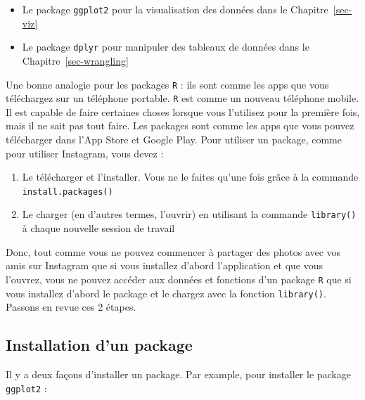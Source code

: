 \documentclass[
  a4paper,
  DIV=11,
  numbers=noendperiod,
  oneside]{scrreprt}
\providecommand{\tightlist}{%
  \setlength{\itemsep}{0pt}\setlength{\parskip}{0pt}}\usepackage{longtable,booktabs,array}
\begin{document}
\begin{itemize}
\tightlist
\item
  Le package \texttt{ggplot2} pour la visualisation des données dans le
  Chapitre~\ref{sec-viz}
\item
  Le package \texttt{dplyr} pour manipuler des tableaux de données dans
  le Chapitre~\ref{sec-wrangling}
\end{itemize}

Une bonne analogie pour les packages \texttt{R} : ils sont comme les
apps que vous téléchargez sur un téléphone portable. \texttt{R} est
comme un nouveau téléphone mobile. Il est capable de faire certaines
choses lorsque vous l'utilisez pour la première fois, mais il ne sait
pas tout faire. Les packages sont comme les apps que vous pouvez
télécharger dans l'App Store et Google Play. Pour utiliser un package,
comme pour utiliser Instagram, vous devez :

\begin{enumerate}
\def\labelenumi{\arabic{enumi}.}
\tightlist
\item
  Le télécharger et l'installer. Vous ne le faites qu'une fois grâce à
  la commande \texttt{install.packages()}
\item
  Le charger (en d'autres termes, l'ouvrir) en utilisant la commande
  \texttt{library()} à chaque nouvelle session de travail
\end{enumerate}

Donc, tout comme vous ne pouvez commencer à partager des photos avec vos
amis sur Instagram que si vous installez d'abord l'application et que
vous l'ouvrez, vous ne pouvez accéder aux données et fonctions d'un
package \texttt{R} que si vous installez d'abord le package et le
chargez avec la fonction \texttt{library()}. Passons en revue ces 2
étapes.

\subsection{Installation d'un package}\label{installation-dun-package}

Il y a deux façons d'installer un package. Par example, pour installer
le package \texttt{ggplot2} :
\end{document}
